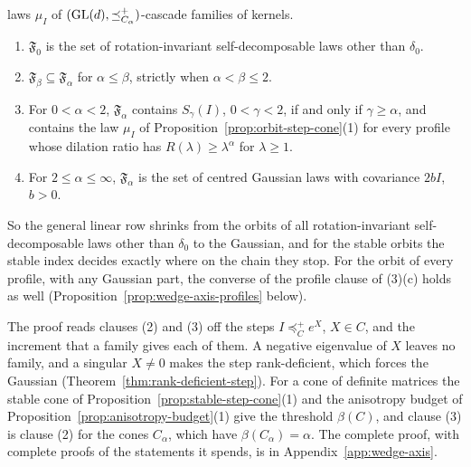 \begin{theorem}
\begin{enumerate}
laws $\mu_I$ of $(\mathrm{GL}(d), \preceq^+_{C_\alpha})$-cascade families of kernels.
\begin{enumerate}
\item[(a)] $\mathfrak F_0$ is the set of rotation-invariant self-decomposable laws other than $\delta_0$.
\item[(b)] $\mathfrak F_\beta \subseteq \mathfrak F_\alpha$ for $\alpha \le \beta$, strictly when
$\alpha < \beta \le 2$.
\item[(c)] For $0 < \alpha < 2$, $\mathfrak F_\alpha$ contains $S_\gamma(I)$, $0 < \gamma < 2$, if and only
if $\gamma \ge \alpha$, and contains the law $\mu_I$ of Proposition~\ref{prop:orbit-step-cone}(1) for every profile whose
dilation ratio has $R(\lambda) \ge \lambda^\alpha$ for $\lambda \ge 1$.
\item[(d)] For $2 \le \alpha \le \infty$, $\mathfrak F_\alpha$ is the set of centred Gaussian laws with
covariance $2bI$, $b > 0$.
\end{enumerate}
\end{enumerate}
\end{theorem}

So the general linear row shrinks from the orbits of all rotation-invariant self-decomposable laws other
than $\delta_0$ to the Gaussian, and for the stable
orbits the stable index decides exactly where on the chain they stop. For the orbit of
every profile, with any Gaussian part, the converse of the profile clause of (3)(c) holds as well
(Proposition~\ref{prop:wedge-axis-profiles} below).

The proof reads clauses (2) and (3) off the steps $I \preceq^+_C e^X$, $X \in C$, and the increment that a
family gives each of them. A negative eigenvalue of $X$ leaves no family, and a singular $X \ne 0$ makes
the step rank-deficient, which forces the Gaussian (Theorem~\ref{thm:rank-deficient-step}). For a cone of
definite matrices the stable cone of Proposition~\ref{prop:stable-step-cone}(1) and the anisotropy budget
of Proposition~\ref{prop:anisotropy-budget}(1) give the threshold $\beta(C)$, and clause (3) is clause (2)
for the cones $C_\alpha$, which have $\beta(C_\alpha) = \alpha$. The complete proof, with complete proofs of
the statements it spends, is in Appendix~\ref{app:wedge-axis}.

